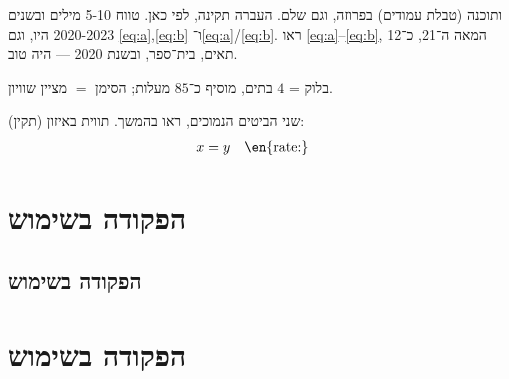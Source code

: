 ותוכנה (טבלת עמודים) בפרוזה, וגם  שלם.
העברה  תקינה, לפי  כאן.
טווח 5-10 מילים ובשנים 2020-2023 היו, וגם \ref{eq:a},\ref{eq:b} ו־\ref{eq:a}/\ref{eq:b}.
ראו \autoref{eq:a}–\autoref{eq:b}, המאה ה־21, כ־12 תאים, בית־ספר, ובשנת 2020 — היה טוב.

בלוק = $4$ בתים, מוסיף כ־$85$ מעלות; הסימן $=$ מציין שוויון.

\item[\textbf{\en{Offset}:}] שני הביטים הנמוכים, ראו  בהמשך.
תווית באיזון (תקין): \begin{align}x &= y && \text{\en{rate:}} \end{align}

\section{הפקודה  בשימוש}
\subsection*{הפקודה  בשימוש}
\section{הפקודה \texorpdfstring{}{grep} בשימוש}
